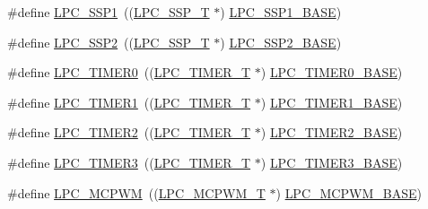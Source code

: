 \begin{DoxyCompactItemize}
\item 
\#define \hyperlink{group__PERIPH__407X__8X__BASE_ga09c4610ada1d9aa18913963cbd1a6e52}{L\-P\-C\-\_\-\-S\-S\-P1}~((\hyperlink{structLPC__SSP__T}{L\-P\-C\-\_\-\-S\-S\-P\-\_\-\-T}              $\ast$) \hyperlink{group__PERIPH__407X__8X__BASE_ga05d118997f53f596d3a087f8b91a1969}{L\-P\-C\-\_\-\-S\-S\-P1\-\_\-\-B\-A\-S\-E})
\item 
\#define \hyperlink{group__PERIPH__407X__8X__BASE_ga1e342299e20b4a502b4c71d292fc8eeb}{L\-P\-C\-\_\-\-S\-S\-P2}~((\hyperlink{structLPC__SSP__T}{L\-P\-C\-\_\-\-S\-S\-P\-\_\-\-T}              $\ast$) \hyperlink{group__PERIPH__407X__8X__BASE_ga1460d4b0a86fa00b3d3ef8abd21abbc1}{L\-P\-C\-\_\-\-S\-S\-P2\-\_\-\-B\-A\-S\-E})
\item 
\#define \hyperlink{group__PERIPH__407X__8X__BASE_ga800f32a8a38d9e9c8f3b6ab161f6f2d2}{L\-P\-C\-\_\-\-T\-I\-M\-E\-R0}~((\hyperlink{structLPC__TIMER__T}{L\-P\-C\-\_\-\-T\-I\-M\-E\-R\-\_\-\-T}            $\ast$) \hyperlink{group__PERIPH__407X__8X__BASE_ga58d2cc2a6a4bd9319853ad5b62a20d43}{L\-P\-C\-\_\-\-T\-I\-M\-E\-R0\-\_\-\-B\-A\-S\-E})
\item 
\#define \hyperlink{group__PERIPH__407X__8X__BASE_ga0d28200f11e877cece24025ebe7fe72a}{L\-P\-C\-\_\-\-T\-I\-M\-E\-R1}~((\hyperlink{structLPC__TIMER__T}{L\-P\-C\-\_\-\-T\-I\-M\-E\-R\-\_\-\-T}            $\ast$) \hyperlink{group__PERIPH__407X__8X__BASE_ga077e94a95d95d79f6aeb0ea962377c46}{L\-P\-C\-\_\-\-T\-I\-M\-E\-R1\-\_\-\-B\-A\-S\-E})
\item 
\#define \hyperlink{group__PERIPH__407X__8X__BASE_gae0a3c421e7e1ac3ffd7e740e33387dc5}{L\-P\-C\-\_\-\-T\-I\-M\-E\-R2}~((\hyperlink{structLPC__TIMER__T}{L\-P\-C\-\_\-\-T\-I\-M\-E\-R\-\_\-\-T}            $\ast$) \hyperlink{group__PERIPH__407X__8X__BASE_gab46122134a159b494e060ae3a7be0967}{L\-P\-C\-\_\-\-T\-I\-M\-E\-R2\-\_\-\-B\-A\-S\-E})
\item 
\#define \hyperlink{group__PERIPH__407X__8X__BASE_gab34ae64ea250497b5148b7ffb61d04f5}{L\-P\-C\-\_\-\-T\-I\-M\-E\-R3}~((\hyperlink{structLPC__TIMER__T}{L\-P\-C\-\_\-\-T\-I\-M\-E\-R\-\_\-\-T}            $\ast$) \hyperlink{group__PERIPH__407X__8X__BASE_ga002e95d51eef32473052ea2575440eac}{L\-P\-C\-\_\-\-T\-I\-M\-E\-R3\-\_\-\-B\-A\-S\-E})
\item 
\#define \hyperlink{group__PERIPH__407X__8X__BASE_ga6fe8e415821195a786b3f0dc5e7fc9fa}{L\-P\-C\-\_\-\-M\-C\-P\-W\-M}~((\hyperlink{structLPC__MCPWM__T}{L\-P\-C\-\_\-\-M\-C\-P\-W\-M\-\_\-\-T}            $\ast$) \hyperlink{group__PERIPH__407X__8X__BASE_gad8a41dc802e3ea0ba9457d42a6927c03}{L\-P\-C\-\_\-\-M\-C\-P\-W\-M\-\_\-\-B\-A\-S\-E})

\end{DoxyCompactItemize}

